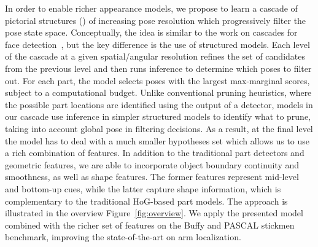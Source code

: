 In order to enable richer appearance models, we propose to learn a cascade of 
pictorial structures (\CPS) of increasing pose resolution which 
progressively filter the pose state space.  Conceptually, the idea is similar 
to the work on cascades for face detection~\cite{geman2001,viola02}, but the 
key difference is the use of structured models. Each level of the cascade at a 
given spatial/angular resolution refines the set of candidates from the 
previous level and then runs inference to determine which poses to filter out.  
For each part, the model selects poses with the largest max-marginal scores, 
subject to a computational budget.  Unlike conventional pruning heuristics, 
where the possible part locations are identified using the output of a 
detector, models in our cascade use inference in simpler structured models to 
identify what to prune, taking into account global pose in filtering decisions.
As a result, at the final level the \CPS{} model has to deal with a much 
smaller hypotheses set which allows us to use a rich combination of features.  
In addition to the traditional part detectors and geometric features, we are 
able to incorporate object boundary continuity and smoothness, as well as shape 
features. The former features represent mid-level and bottom-up cues, while the 
latter capture shape information, which is complementary to the traditional 
HoG-based part models.  The approach is illustrated in the overview 
Figure~\ref{fig:overview}. We apply the presented \CPS model combined 
with the richer set of features on the Buffy and PASCAL stickmen benchmark, 
improving the state-of-the-art on arm localization. 

